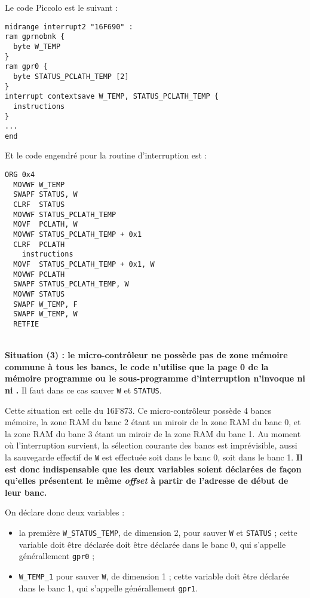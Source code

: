 Le code Piccolo est le suivant :
\begin{lstlisting}[language=piccolo]
midrange interrupt2 "16F690" :
ram gprnobnk {
  byte W_TEMP
}
ram gpr0 {
  byte STATUS_PCLATH_TEMP [2]
}
interrupt contextsave W_TEMP, STATUS_PCLATH_TEMP {
  instructions
}
...
end
\end{lstlisting}

Et le code engendré pour la routine d'interruption est :
\begin{lstlisting}[language=assembleur]
  ORG 0x4
  MOVWF W_TEMP
  SWAPF STATUS, W
  CLRF  STATUS
  MOVWF STATUS_PCLATH_TEMP
  MOVF  PCLATH, W
  MOVWF STATUS_PCLATH_TEMP + 0x1
  CLRF  PCLATH
    instructions
  MOVF  STATUS_PCLATH_TEMP + 0x1, W
  MOVWF PCLATH
  SWAPF STATUS_PCLATH_TEMP, W
  MOVWF STATUS
  SWAPF W_TEMP, F
  SWAPF W_TEMP, W
  RETFIE
\end{lstlisting}







~\\
\textbf{Situation (3) : le micro-contrôleur ne possède pas de zone mémoire commune à tous les bancs, le code n'utilise que la page 0 de la mémoire programme ou le sous-programme d'interruption n'invoque ni  ni .} Il faut dans ce cas sauver \texttt{W} et \texttt{STATUS}.

Cette situation est celle du 16F873. Ce micro-contrôleur possède 4 bancs mémoire, la zone RAM du banc 2 étant un miroir de la zone RAM du banc 0, et la zone RAM du banc 3 étant un miroir de la zone RAM du banc 1. Au moment où l'interruption survient, la sélection courante des bancs est imprévisible, aussi la sauvegarde effectif de \texttt{W} est effectuée soit dans le banc 0, soit dans le banc 1. \textbf{Il est donc indispensable que les deux variables soient déclarées de façon qu'elles présentent le même \emph{offset} à partir de l'adresse de début de leur banc.}

On déclare donc deux variables :
\begin{itemize}
  \item la première \texttt{W\_STATUS\_TEMP}, de dimension 2, pour sauver \texttt{W} et \texttt{STATUS} ; cette variable doit être déclarée doit être déclarée dans le banc 0, qui s'appelle générallement \texttt{gpr0} ; 
  \item \texttt{W\_TEMP\_1} pour sauver \texttt{W}, de dimension 1 ; cette variable doit être déclarée dans le banc 1, qui s'appelle générallement \texttt{gpr1}.

\end{itemize}

